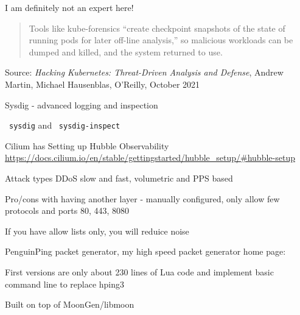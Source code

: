 \documentclass[Screen16to9,17pt]{foils}
\begin{document}

I am definitely not an expert here!

\begin{quote}
Tools like kube-forensics “create checkpoint snapshots of the state of running pods for later off-line analysis,” so malicious workloads can be dumped and killed, and the system returned to use.
\end{quote}
Source: \emph{Hacking Kubernetes: Threat-Driven Analysis and Defense}, Andrew Martin, Michael Hausenblas, O'Reilly, October 2021


\begin{list2}
\item Sysdig - advanced logging and inspection
\item \faWrench\ \verb+sysdig+ and \faWrench\ \verb+sysdig-inspect+

\end{list2}


\begin{list2}
\item Cilium has Setting up Hubble Observability \\
\url{https://docs.cilium.io/en/stable/gettingstarted/hubble_setup/#hubble-setup}
\item Attack types DDoS slow and fast, volumetric and PPS based
\item Pro/cons with having another layer - manually configured, only allow few protocols and ports 80, 443, 8080
\item If you have allow lists only, you will reduice noise
\end{list2}




\begin{list2}
\item PenguinPing packet generator, my high speed packet generator
home page: 
\item First versions are only about 230 lines of Lua code and implement basic command line to replace hping3
\item Built on top of MoonGen/libmoon 
\end{list2}
\end{document}
